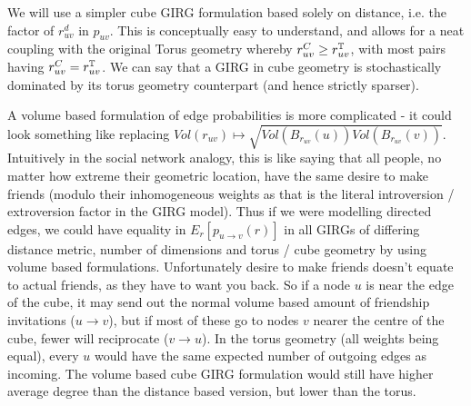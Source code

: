 We will use a simpler cube GIRG formulation based solely on distance, i.e. the factor of $r_{uv}^d$ in $p_{uv}$. This is conceptually easy to understand, and allows for a neat coupling with the original Torus geometry whereby $r_{uv}^C \geq r_{uv}^{\mathbb{T}}$, with most pairs having $r_{uv}^C = r_{uv}^{\mathbb{T}}$. We can say that a GIRG in cube geometry is stochastically dominated by its torus geometry counterpart (and hence strictly sparser). 

A volume based formulation of edge probabilities is more complicated - it could look something like replacing $Vol(r_{uv}) \mapsto \sqrt{Vol(B_{r_{uv}}(u)) Vol(B_{r_{uv}}(v))}$.
Intuitively in the social network analogy, this is like saying that all people, no matter how extreme their geometric location, have the same desire to make friends (modulo their inhomogeneous weights as that is the literal introversion / extroversion factor in the GIRG model).
Thus if we were modelling directed edges, we could have equality in $E_r[p_{u \to v}(r)]$ in all GIRGs of differing distance metric, number of dimensions and torus / cube geometry by using volume based formulations.
Unfortunately desire to make friends doesn't equate to actual friends, as they have to want you back.
So if a node $u$ is near the edge of the cube, it may send out the normal volume based amount of friendship invitations ($u \to v$), but if most of these go to nodes $v$ nearer the centre of the cube, fewer will reciprocate ($v \to u$). In the torus geometry (all weights being equal), every $u$ would have the same expected number of outgoing edges as incoming. The volume based cube GIRG formulation would still have higher average degree than the distance based version, but lower than the torus.




